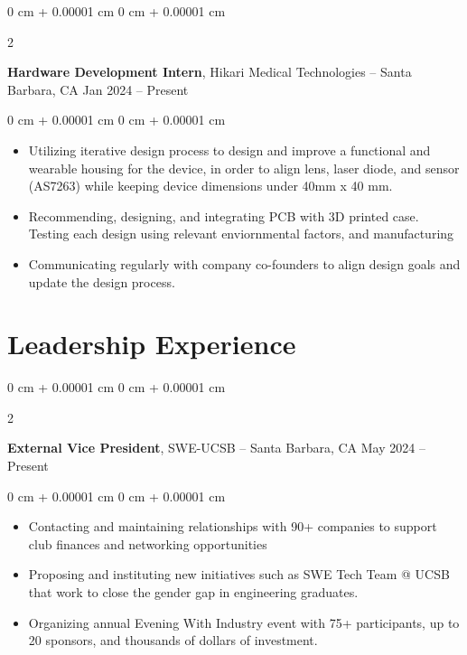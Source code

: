 \documentclass[10pt, letterpaper]{article}
\newenvironment{highlights}{
    \begin{itemize}[
        topsep=0.10 cm,
        parsep=0.10 cm,
        partopsep=0pt,
        itemsep=0pt,
        leftmargin=0 cm + 10pt
    ]
}{
    \end{itemize}
} %
\newenvironment{onecolentry}{
    \begin{adjustwidth}{
        0 cm + 0.00001 cm
    }{
        0 cm + 0.00001 cm
    }
}{
    \end{adjustwidth}
} %
\newenvironment{twocolentry}[2][]{
    \onecolentry
    \def\secondColumn{#2}
    \setcolumnwidth{\fill, 4.5 cm}
    \begin{paracol}{2}
}{
    \switchcolumn \raggedleft \secondColumn
    \end{paracol}
    \endonecolentry
} %
\begin{document}
    \vspace{0.2 cm}
    
    \begin{twocolentry}{
            Jan 2024 – Present
        }
            \textbf{Hardware Development Intern}, Hikari Medical Technologies -- Santa Barbara, CA\end{twocolentry}

        \vspace{0.10 cm}
        \begin{onecolentry}
            \begin{highlights}
                \item Utilizing iterative design process to design and improve a functional and wearable housing for the device, in order to align lens, laser diode, and sensor (AS7263) while keeping device dimensions under 40mm x 40 mm.
                \item Recommending, designing, and integrating PCB with 3D printed case. Testing each design using relevant enviornmental factors, and manufacturing
                \item Communicating regularly with company co-founders to align design goals and update the design process.
            \end{highlights}
        \end{onecolentry}

        \vspace{0.2 cm}


    \section{Leadership Experience}

        \begin{twocolentry}{
            May 2024 – Present
        }
            \textbf{External Vice President}, SWE-UCSB -- Santa Barbara, CA\end{twocolentry}

        \vspace{0.10 cm}
        \begin{onecolentry}
            \begin{highlights}
                \item Contacting and maintaining relationships with 90+ companies to support club finances and networking opportunities 
                \item Proposing and instituting new initiatives such as SWE Tech Team @ UCSB that work to close the gender gap in engineering graduates.
                \item Organizing annual Evening With Industry event with 75+ participants, up to 20 sponsors, and thousands of dollars of investment.
            \end{highlights}
        \end{onecolentry}
\end{document}
